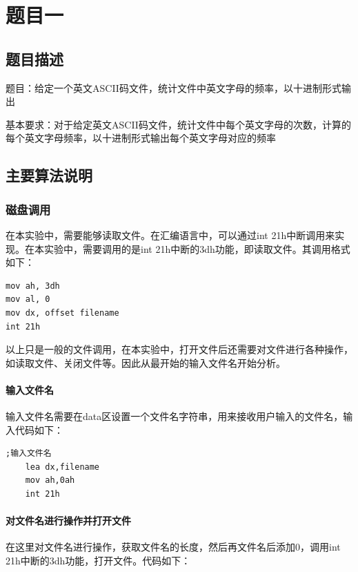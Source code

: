 \documentclass[UTF8,12pt]{article}
\begin{document}
\begin{center}
    \tableofcontents
\end{center}
\newpage

\section{题目一}
\subsection{题目描述}
题目：给定一个英文ASCII码文件，统计文件中英文字母的频率，以十进制形式输出

基本要求：对于给定英文ASCII码文件，统计文件中每个英文字母的次数，计算的每个英文字母频率，以十进制形式输出每个英文字母对应的频率

\subsection{主要算法说明}
\subsubsection{磁盘调用}
在本实验中，需要能够读取文件。在汇编语言中，可以通过int 21h中断调用来实现。在本实验中，需要调用的是int 21h中断的3dh功能，即读取文件。其调用格式如下：

\begin{lstlisting}[title=中断调用,frame=shadowbox]
mov ah, 3dh
mov al, 0
mov dx, offset filename
int 21h
\end{lstlisting}

以上只是一般的文件调用，在本实验中，打开文件后还需要对文件进行各种操作，如读取文件、关闭文件等。因此从最开始的输入文件名开始分析。

\paragraph{输入文件名}
输入文件名需要在data区设置一个文件名字符串，用来接收用户输入的文件名，输入代码如下：

\begin{lstlisting}[title=输入文件名,frame=shadowbox]
    ;输入文件名
    lea dx,filename
    mov ah,0ah
    int 21h
\end{lstlisting}

\paragraph{对文件名进行操作并打开文件}
在这里对文件名进行操作，获取文件名的长度，然后再文件名后添加0，调用int 21h中断的3dh功能，打开文件。代码如下：
\end{document}
